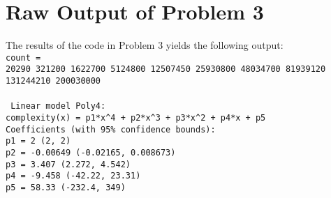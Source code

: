 \documentclass[11pt]{article}
\begin{document}
\section{Raw Output of Problem 3}
The results of the code in Problem 3 yields the following output:\\
\texttt
{count = \\
20290      321200     1622700     5124800    12507450    25930800    48034700    81939120   131244210   200030000}\\\\
\texttt{
     Linear model Poly4:\\
     complexity(x) = p1*x\^{}4 + p2*x\^{}3 + p3*x\^{}2 + p4*x + p5\\
     Coefficients (with 95\% confidence bounds):\\
       p1 =           2  (2, 2)\\
       p2 =    -0.00649  (-0.02165, 0.008673)\\
       p3 =       3.407  (2.272, 4.542)\\
       p4 =      -9.458  (-42.22, 23.31)\\
       p5 =       58.33  (-232.4, 349)}\\
\end{document}
